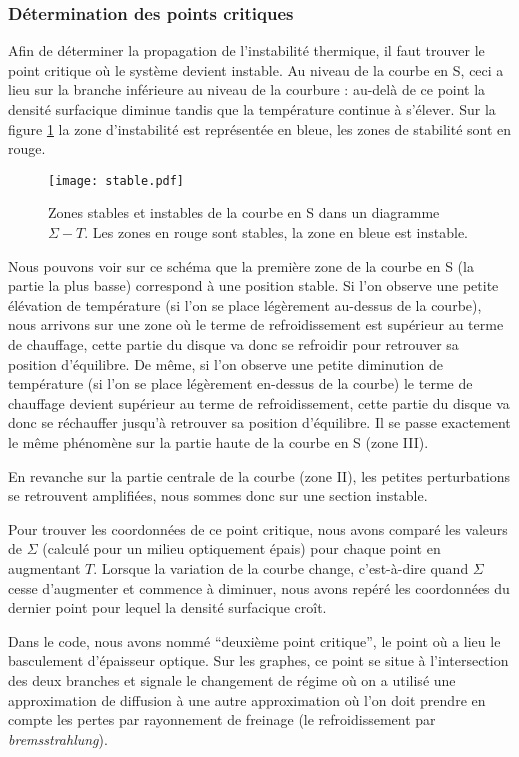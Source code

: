 \subsubsection{Détermination des points critiques}
Afin de déterminer la propagation de l'instabilité thermique, il faut trouver le point critique où le système devient instable. Au niveau de la courbe en S, ceci a lieu sur la branche inférieure au niveau de la courbure : au-delà de ce point la densité surfacique diminue tandis que la température continue à s'élever. Sur la figure \ref{Fig::stable} la zone d'instabilité est représentée en bleue, les zones de stabilité sont en rouge.

\begin{figure}[htb!]
	\centering
	\texttt{[image: stable.pdf]}
	\caption{Zones stables et instables de la courbe en S dans un diagramme $\Sigma-T$. Les zones en rouge sont stables, la zone en bleue est instable.}
	\label{Fig::stable}
\end{figure}

Nous pouvons voir sur ce schéma que la première zone de la courbe en S (la partie la plus basse) correspond à une position stable. Si l'on observe une petite élévation de température (si l'on se place légèrement au-dessus de la courbe), nous arrivons sur une zone où le terme de refroidissement est supérieur au terme de chauffage, cette partie du disque va donc se refroidir pour retrouver sa position d'équilibre. De même, si l'on observe une petite diminution de température (si l'on se place légèrement en-dessus de la courbe) le terme de chauffage devient supérieur au terme de refroidissement, cette partie du disque va donc se réchauffer jusqu'à retrouver sa position d'équilibre. Il se passe exactement le même phénomène sur la partie haute de la courbe en S (zone III).

En revanche sur la partie centrale de la courbe (zone II), les petites perturbations se retrouvent amplifiées, nous sommes donc sur une section instable.


Pour trouver les coordonnées de ce point critique, nous avons comparé les valeurs de $\Sigma$ (calculé pour un milieu optiquement épais) pour chaque point en augmentant $T$. Lorsque la variation de la courbe change, c'est-à-dire quand $\Sigma$ cesse d'augmenter et commence à diminuer, nous avons repéré les coordonnées du dernier point pour lequel la densité surfacique croît.  

Dans le code, nous avons nommé ``deuxième point critique'', le point où a lieu le basculement d'épaisseur optique. Sur les graphes, ce point se situe à l'intersection des deux branches et signale le changement de régime où on a utilisé une approximation de diffusion à une autre approximation où l'on doit prendre en compte les pertes par rayonnement de freinage (le refroidissement par \emph{bremsstrahlung}).

